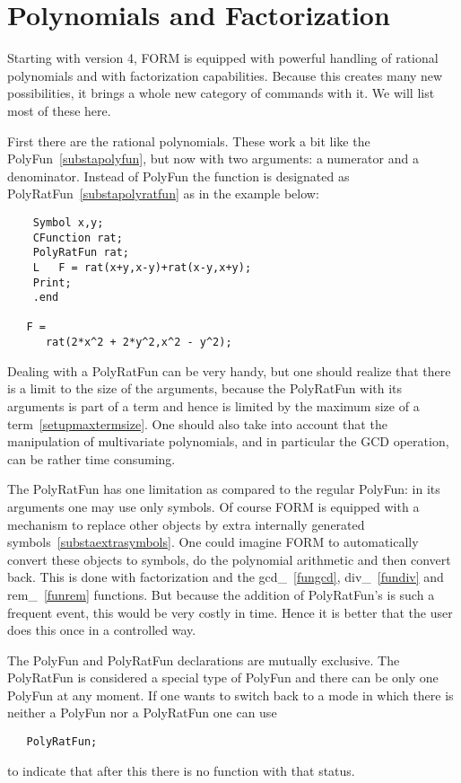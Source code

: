 
\chapter{Polynomials and Factorization}
\label{polynomials}

\noindent Starting with version 4, FORM is equipped with powerful handling 
of rational polynomials and with factorization capabilities. Because this 
creates many new possibilities, it brings a whole new category of commands 
with it. We will list most of these here.

\noindent First there are the rational polynomials. These work a bit like 
the PolyFun~\ref{substapolyfun}, but now with two arguments: a numerator and 
a denominator. Instead of PolyFun the function is designated as 
PolyRatFun~\ref{substapolyratfun} as in the example below:
\begin{verbatim}
    Symbol x,y;
    CFunction rat;
    PolyRatFun rat;
    L   F = rat(x+y,x-y)+rat(x-y,x+y);
    Print;
    .end

   F =
      rat(2*x^2 + 2*y^2,x^2 - y^2);
\end{verbatim}
Dealing with a PolyRatFun can be very handy, but one should realize that 
there is a limit to the size of the arguments, because the PolyRatFun with 
its arguments is part of a term and hence is limited by the maximum size of 
a term~\ref{setupmaxtermsize}. One should also take into account that the 
manipulation of multivariate polynomials, and in particular the GCD 
operation, can be rather time consuming.

\noindent The PolyRatFun has one limitation as compared to the regular 
PolyFun: in its arguments one may use only symbols. Of course FORM is 
equipped with a mechanism to replace other objects by extra internally 
generated symbols~\ref{substaextrasymbols}. One could imagine FORM to 
automatically convert these objects to symbols, do the polynomial 
arithmetic and then convert back. This is done with factorization and the 
gcd\_~\ref{fungcd}, 
div\_~\ref{fundiv} 
and rem\_~\ref{funrem} functions. But 
because the addition of PolyRatFun's is such a frequent event, this would 
be very costly in time. Hence it is better that the user does this once 
in a controlled way.

\noindent The PolyFun and PolyRatFun declarations are mutually exclusive. 
The PolyRatFun is considered a special type of PolyFun and there can be 
only one PolyFun at any moment. If one wants to switch back to a mode in 
which there is neither a PolyFun nor a PolyRatFun one can use
\begin{verbatim}
   PolyRatFun;
\end{verbatim}
to indicate that after this there is no function with that status.

